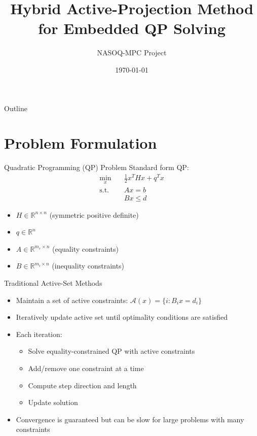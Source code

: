 \documentclass{beamer}
\title{Hybrid Active-Projection Method for Embedded QP Solving}
\author{NASOQ-MPC Project}
\date{\today}
\begin{document}
\begin{frame}
    \titlepage
\end{frame}

\begin{frame}{Outline}
    \tableofcontents
\end{frame}

\section{Problem Formulation}

\begin{frame}{Quadratic Programming (QP) Problem}
    Standard form QP:
    \begin{align}
        \min_x \quad & \frac{1}{2}x^T H x + q^T x \\
        \text{s.t.} \quad & Ax = b \\
        & Bx \leq d
    \end{align}
    
    \begin{itemize}
        \item $H \in \mathbb{R}^{n \times n}$ (symmetric positive definite)
        \item $q \in \mathbb{R}^n$
        \item $A \in \mathbb{R}^{m_e \times n}$ (equality constraints)
        \item $B \in \mathbb{R}^{m_i \times n}$ (inequality constraints)
    \end{itemize}
\end{frame}

\begin{frame}{Traditional Active-Set Methods}
    \begin{itemize}
        \item Maintain a set of active constraints: $\mathcal{A}(x) = \{i : B_i x = d_i\}$
        \item Iteratively update active set until optimality conditions are satisfied
        \item Each iteration:
            \begin{itemize}
                \item Solve equality-constrained QP with active constraints
                \item Add/remove one constraint at a time
                \item Compute step direction and length
                \item Update solution
            \end{itemize}
        \item Convergence is guaranteed but can be slow for large problems with many constraints
    \end{itemize}
\end{frame}
\end{document}
